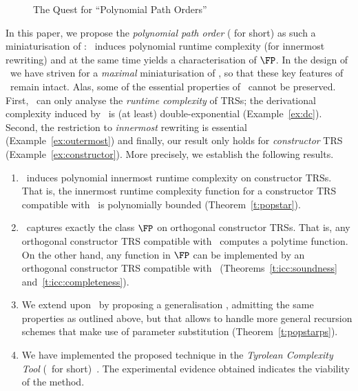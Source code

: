 \documentclass{LMCS}
\begin{document}
\begin{figure}
  \centering
  \caption{The Quest for ``Polynomial Path Orders''}
  \label{fig:3}
\end{figure}

In this paper, we propose the \emph{polynomial path order} (\emph{\POPSTAR} for short)
as such a miniaturisation of \MPO: \POPSTAR\ induces
polynomial runtime complexity (for innermost rewriting) and at the
same time yields a characterisation of $\FP$. 
In the design of \POPSTAR\ we have striven for a \emph{maximal} miniaturisation
of \MPO, so that these key features of \POPSTAR\ remain intact. 
Alas, some of the essential properties of \MPO\ cannot be preserved. 
First, \POPSTAR\ can only analyse the \emph{runtime complexity} of TRSs; the derivational
complexity induced by \POPSTAR\ is (at least) double-exponential
(Example~\ref{ex:dc}). Second, the restriction to \emph{innermost}
rewriting is essential (Example~\ref{ex:outermost}) and
finally, our result only holds for \emph{constructor} TRS (Example~\ref{ex:constructor}).
More precisely, we establish the following results.

\begin{enumerate}[labelsep=*,leftmargin=*]
\item \POPSTAR\ induces polynomial innermost runtime complexity on constructor TRSs. That is,
the innermost runtime complexity function for a constructor TRS compatible with \POPSTAR\ is
polynomially bounded (Theorem~\ref{t:popstar}).
\item \POPSTAR\ captures exactly the class $\FP$ on orthogonal constructor TRSs. That is,
any orthogonal constructor TRS compatible with \POPSTAR\ computes a polytime function.
On the other hand, any function in $\FP$ can be implemented by an orthogonal constructor
TRS compatible with \POPSTAR\ (Theorems~\ref{t:icc:soundness} and~\ref{t:icc:completeness}).

\item We extend upon \POPSTAR\ by proposing 
  a generalisation \POPSTARP, admitting the same properties as outlined above, 
  but that allows to handle more general recursion schemes that make
  use of parameter substitution (Theorem~\ref{t:popstarps}).
\item We have implemented the proposed technique in 
the \emph{Tyrolean Complexity Tool} (\TCT\ for short)~\cite{AM13b}.
The experimental evidence obtained indicates the viability of the method.
\end{enumerate}
\end{document}
